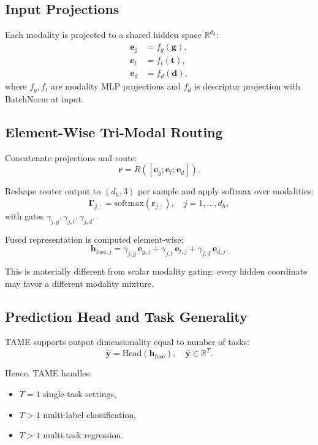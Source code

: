 \documentclass[11pt,a4paper]{article}
\begin{document}
\subsection{Input Projections}
Each modality is projected to a shared hidden space $\mathbb{R}^{d_h}$:
\begin{align}
\mathbf{e}_g &= f_g(\mathbf{g}),\\
\mathbf{e}_t &= f_t(\mathbf{t}),\\
\mathbf{e}_d &= f_d(\mathbf{d}),
\end{align}
where $f_g, f_t$ are modality MLP projections and $f_d$ is descriptor projection with BatchNorm at input.

\subsection{Element-Wise Tri-Modal Routing}
Concatenate projections and route:
\begin{equation}
\mathbf{r} = R([\mathbf{e}_g;\mathbf{e}_t;\mathbf{e}_d]).
\end{equation}

Reshape router output to $(d_h, 3)$ per sample and apply softmax over modalities:
\begin{equation}
\mathbf{\Gamma}_{j,:} = \mathrm{softmax}(\mathbf{r}_{j,:}), \quad j=1,\dots,d_h,
\end{equation}
with gates $\gamma_{j,g}, \gamma_{j,t}, \gamma_{j,d}$.

Fused representation is computed element-wise:
\begin{equation}
\mathbf{h}_{\text{fuse},j} = \gamma_{j,g}\,\mathbf{e}_{g,j} + \gamma_{j,t}\,\mathbf{e}_{t,j} + \gamma_{j,d}\,\mathbf{e}_{d,j}.
\end{equation}

This is materially different from scalar modality gating: every hidden coordinate may favor a different modality mixture.

\subsection{Prediction Head and Task Generality}
TAME supports output dimensionality equal to number of tasks:
\begin{equation}
\hat{\mathbf{y}} = \mathrm{Head}(\mathbf{h}_{\text{fuse}}), \quad \hat{\mathbf{y}} \in \mathbb{R}^{T}.
\end{equation}

Hence, TAME handles:
\begin{itemize}
    \item $T=1$ single-task settings,
    \item $T>1$ multi-label classification,
    \item $T>1$ multi-task regression.
\end{itemize}
\end{document}

